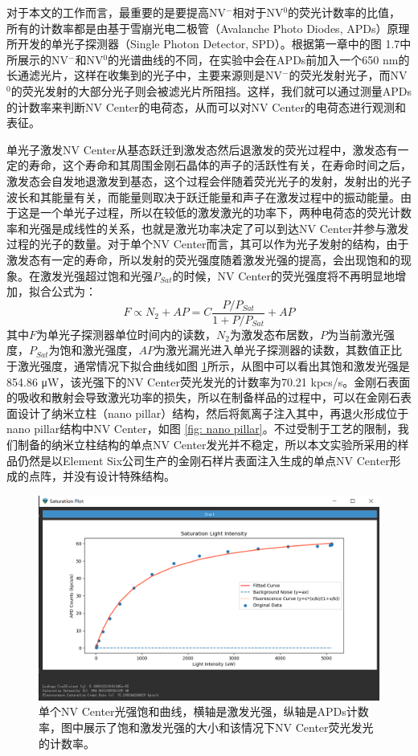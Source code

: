 \documentclass[type = bachelor]{whu-thesis}
\begin{document}
对于本文的工作而言，最重要的是要提高NV$^-$相对于NV$^0$的荧光计数率的比值，所有的计数率都是由基于雪崩光电二极管（Avalanche Photo Diodes, APDs）原理所开发的单光子探测器（Single Photon Detector, SPD）。根据第一章中的图 1.7中所展示的NV$^-$和NV$^0$的光谱曲线的不同，在实验中会在APDs前加入一个650 nm的长通滤光片，这样在收集到的光子中，主要来源则是NV$^-$的荧光发射光子，而NV$^0$的荧光发射的大部分光子则会被滤光片所阻挡。这样，我们就可以通过测量APDs的计数率来判断NV Center的电荷态，从而可以对NV Center的电荷态进行观测和表征。

单光子激发NV Center从基态跃迁到激发态然后退激发的荧光过程中，激发态有一定的寿命，这个寿命和其周围金刚石晶体的声子的活跃性有关，在寿命时间之后，激发态会自发地退激发到基态，这个过程会伴随着荧光光子的发射，发射出的光子波长和其能量有关，而能量则取决于跃迁能量和声子在激发过程中的振动能量。由于这是一个单光子过程，所以在较低的激发激光的功率下，两种电荷态的荧光计数率和光强是成线性的关系，也就是激光功率决定了可以到达NV Center并参与激发过程的光子的数量\cite{Aslam2013}。对于单个NV Center而言，其可以作为光子发射的结构，由于激发态有一定的寿命，所以发射的荧光强度随着激发光强的提高，会出现饱和的现象。在激发光强超过饱和光强$P_{Sat}$的时候，NV Center的荧光强度将不再明显地增加，拟合公式为：
\begin{equation}
  F \propto N_2 +AP = C \frac{P/P_{Sat}}{1+P/P_{Sat}}+AP
\end{equation} 
其中$F$为单光子探测器单位时间内的读数，$N_2$为激发态布居数，$P$为当前激光强度，$P_{Sat}$为饱和激光强度，$AP$为激光漏光进入单光子探测器的读数，其数值正比于激光强度，通常情况下拟合曲线如图 \ref{fig: Saturation Plot}所示，从图中可以看出其饱和激发光强是854.86 \unit{\uW}，该光强下的NV Center荧光发光的计数率为70.21 kpcs/s。金刚石表面的吸收和散射会导致激光功率的损失，所以在制备样品的过程中，可以在金刚石表面设计了纳米立柱（nano pillar）结构，然后将氮离子注入其中，再退火形成位于nano pillar结构中NV Center，如图 \ref{fig: nano pillar}。不过受制于工艺的限制，我们制备的纳米立柱结构的单点NV Center发光并不稳定，所以本文实验所采用的样品仍然是以Element Six公司生产的金刚石样片表面注入生成的单点NV Center形成的点阵，并没有设计特殊结构。

\begin{figure}
  \centering
  \includegraphics[width=1.0\textwidth]{figures/Chapter 3/Saturation Plot.png}
  \caption[单个NV Center光强饱和曲线]{单个NV Center光强饱和曲线，横轴是激发光强，纵轴是APDs计数率，图中展示了饱和激发光强的大小和该情况下NV Center荧光发光的计数率。}
  \label{fig: Saturation Plot}
\end{figure}
\end{document}
